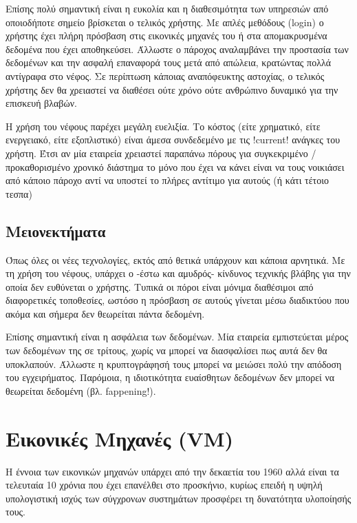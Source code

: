 Επίσης πολύ σημαντική είναι η ευκολία και η διαθεσιμότητα των υπηρεσιών από
οποιοδήποτε σημείο βρίσκεται ο τελικός χρήστης. Με απλές μεθόδους (login) ο
χρήστης έχει πλήρη πρόσβαση στις εικονικές μηχανές του ή στα απομακρυσμένα
δεδομένα που έχει αποθηκεύσει. Άλλωστε ο πάροχος αναλαμβάνει την προστασία των
δεδομένων και την ασφαλή επαναφορά τους μετά από απώλεια, κρατώντας πολλά αντίγραφα
στο νέφος. Σε περίπτωση κάποιας αναπόφευκτης αστοχίας, ο τελικός χρήστης δεν
θα χρειαστεί να διαθέσει ούτε χρόνο ούτε ανθρώπινο δυναμικό για την επισκευή
βλαβών.

Η χρήση του νέφους παρέχει μεγάλη ευελιξία. Το κόστος (είτε χρηματικό, είτε
ενεργειακό, είτε εξοπλιστικό) είναι άμεσα συνδεδεμένο με τις !current! ανάγκες
του χρήστη. Έτσι αν μία εταιρεία χρειαστεί παραπάνω πόρους για συγκεκριμένο /
προκαθορισμένο χρονικό διάστημα το μόνο που έχει να κάνει είναι να τους
νοικιάσει από κάποιο πάροχο αντί να υποστεί το πλήρες αντίτιμο για αυτούς (ή
κάτι τέτοιο τεσπα)

\subsection{Μειονεκτήματα}
Όπως όλες οι νέες τεχνολογίες, εκτός από θετικά υπάρχουν και κάποια αρνητικά. Με
τη χρήση του νέφους, υπάρχει ο -έστω και αμυδρός- κίνδυνος τεχνικής βλάβης για
την οποία δεν ευθύνεται ο χρήστης. Τυπικά οι πόροι είναι μόνιμα διαθέσιμοι
από διαφορετικές τοποθεσίες, ωστόσο η πρόσβαση σε αυτούς γίνεται μέσω
διαδικτύου που ακόμα και σήμερα δεν θεωρείται πάντα δεδομένη.

Επίσης σημαντική είναι η ασφάλεια των δεδομένων. Μία εταιρεία εμπιστεύεται μέρος
των δεδομένων της σε τρίτους, χωρίς να μπορεί να διασφαλίσει πως αυτά δεν θα
υποκλαπούν. Άλλωστε η κρυπτογράφησή τους μπορεί να μειώσει πολύ την απόδοση του
εγχειρήματος. Παρόμοια, η ιδιοτικότητα ευαίσθητων δεδομένων δεν μπορεί να
θεωρείται δεδομένη (βλ. fappening!).

\section{Εικονικές Μηχανές (VM)}
Η έννοια των εικονικών μηχανών υπάρχει από την δεκαετία του 1960 αλλά είναι τα
τελευταία 10 χρόνια που έχει επανέλθει στο προσκήνιο, κυρίως επειδή η υψηλή
υπολογιστική ισχύς των σύγχρονων συστημάτων προσφέρει τη δυνατότητα υλοποίησής
τους.
